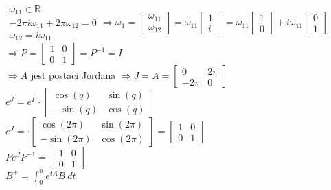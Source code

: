 $\begin{array}{r}\omega_{11} \in \mathbb{R}\\
-2\pi i \omega_{11}+2\pi \omega_{12}=0\\
\omega_{12}=i\omega_{11}\end{array} \Rightarrow \omega_1=\left[ \begin{array}{c}     \omega_{11}\\\omega_{12}    \end{array}\right]=
\omega_{11}\left[ \begin{array}{c}     1\\i    \end{array}\right]=
\omega_{11}\left[ \begin{array}{c}     1\\0    \end{array}\right]+ i\omega_{11}\left[ \begin{array}{c}     0\\1    \end{array}\right]$\\
$\Rightarrow P=\left[ \begin{array}{cc}     1&0\\0&1    \end{array}\right]=P^{-1}=I$\\
$\Rightarrow A$ jest postaci Jordana $\Rightarrow J=A=\left[ \begin{array}{cc}     0&2\pi\\-2\pi&0    \end{array}\right]$\\
$e^J=e^P \cdot\left[ \begin{array}{cc}     \cos(q)&\sin(q)\\-\sin(q)& \cos(q)   \end{array}\right]$\\
$e^J= \cdot\left[ \begin{array}{cc}     \cos(2\pi)&\sin(2\pi)\\-\sin(2\pi)& \cos(2\pi)   \end{array}\right]=\left[ \begin{array}{cc}     1&0\\0& 1   \end{array}\right]$\\
$Pe^JP^{-1}=\left[ \begin{array}{cc}     1&0\\0& 1   \end{array}\right]$\\
$B^+=\int^n_0e^{tA}B \ dt$\\
